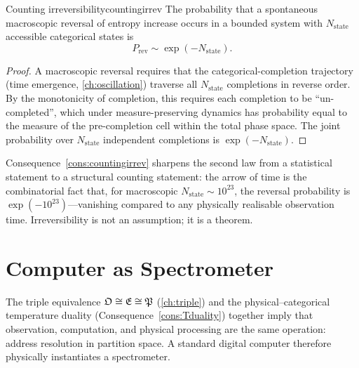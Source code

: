 \begin{consequence}{Counting irreversibility}{countingirrev}
The probability that a spontaneous macroscopic reversal of entropy
increase occurs in a bounded system with $N_{\mathrm{state}}$ accessible
categorical states is
\begin{equation}
  P_{\mathrm{rev}} \sim \exp(-N_{\mathrm{state}}).
  \label{eq:irrev}
\end{equation}
\end{consequence}

\begin{proof}
A macroscopic reversal requires that the categorical-completion trajectory
(time emergence, \cref{ch:oscillation}) traverse all $N_{\mathrm{state}}$
completions in reverse order.  By the monotonicity of completion, this
requires each completion to be ``un-completed'', which under
measure-preserving dynamics has probability equal to the measure of the
pre-completion cell within the total phase space.  The joint probability
over $N_{\mathrm{state}}$ independent completions is
$\exp(-N_{\mathrm{state}})$.
\end{proof}

\begin{remark}
Consequence~\ref{cons:countingirrev} sharpens the second law from a
statistical statement to a structural counting statement: the arrow of
time is the combinatorial fact that, for macroscopic
$N_{\mathrm{state}} \sim 10^{23}$, the reversal probability is
$\exp(-10^{23})$---vanishing compared to any physically realisable
observation time.  Irreversibility is not an assumption; it is a theorem.
\end{remark}

\section{Computer as Spectrometer}
\label{sec:computerasinstrument}

The triple equivalence $\mathfrak{O} \cong \mathfrak{E} \cong \mathfrak{P}$ (\cref{ch:triple})
and the physical--categorical temperature duality
(Consequence~\ref{cons:Tduality}) together imply that observation,
computation, and physical processing are the same operation: address
resolution in partition space.  A standard digital computer therefore
physically instantiates a spectrometer.

